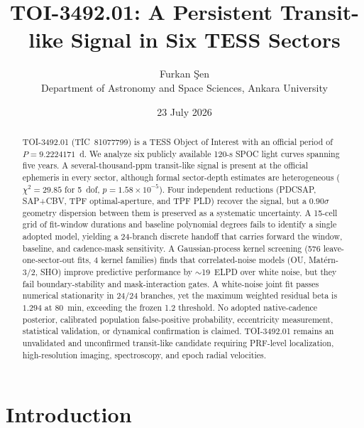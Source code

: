 \documentclass[11pt]{article}
\title{TOI-3492.01: A Persistent Transit-like Signal in Six TESS Sectors}
\author{Furkan \c{S}en\\[4pt]
  \small Department of Astronomy and Space Sciences, Ankara University}
\date{23 July 2026}
\begin{document}

\maketitle

\begin{abstract}
TOI-3492.01 (TIC~81077799) is a TESS Object of Interest with an official
period of $P=9.2224171$~d.  We analyze six publicly available 120-s SPOC
light curves spanning five years.  A several-thousand-ppm transit-like signal
is present at the official ephemeris in every sector, although formal
sector-depth estimates are heterogeneous ($\chi^2=29.85$ for 5~dof,
$p=1.58\times10^{-5}$).  Four independent reductions (PDCSAP, SAP+CBV, TPF
optimal-aperture, and TPF PLD) recover the signal, but a $0.90\sigma$ geometry
dispersion between them is preserved as a systematic uncertainty.  A 15-cell
grid of fit-window durations and baseline polynomial degrees fails to identify a
single adopted model, yielding a 24-branch discrete handoff that carries forward
the window, baseline, and cadence-mask sensitivity.  A Gaussian-process kernel
screening (576 leave-one-sector-out fits, 4 kernel families) finds that
correlated-noise models (OU, Mat\'ern-3/2, SHO) improve predictive performance
by $\sim$19~ELPD over white noise, but they fail boundary-stability and
mask-interaction gates.  A white-noise joint fit passes numerical stationarity in
24/24 branches, yet the maximum weighted residual beta is $1.294$ at 80~min,
exceeding the frozen 1.2 threshold.  No adopted native-cadence posterior,
calibrated population false-positive probability, eccentricity measurement,
statistical validation, or dynamical confirmation is claimed.  TOI-3492.01
remains an unvalidated and unconfirmed transit-like candidate requiring
PRF-level localization, high-resolution imaging, spectroscopy, and epoch
radial velocities.
\end{abstract}

\clearpage
\section{Introduction}
\end{document}
